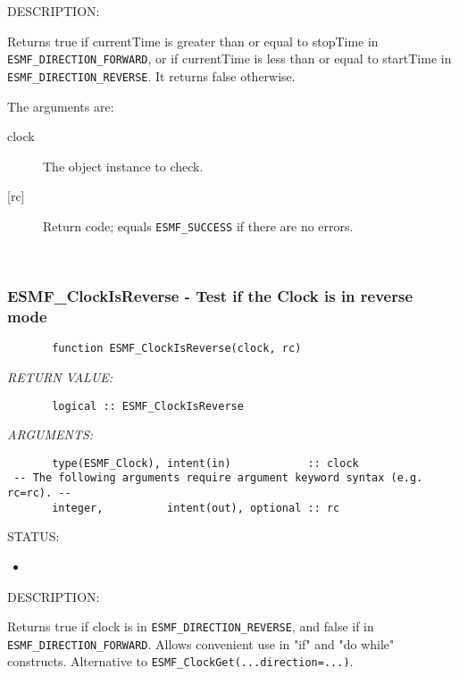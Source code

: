 {\sf DESCRIPTION:\\ }


       Returns true if currentTime is greater than or equal to stopTime
       in {\tt ESMF\_DIRECTION\_FORWARD}, or if currentTime is less than or
       equal to startTime in {\tt ESMF\_DIRECTION\_REVERSE}.  It returns false
       otherwise.
  
       The arguments are:
       \begin{description}
       \item[clock]
            The object instance to check.
       \item[{[rc]}]
            Return code; equals {\tt ESMF\_SUCCESS} if there are no errors.
       \end{description} 
 
\mbox{}\hrulefill\ 
 
\subsubsection [ESMF\_ClockIsReverse] {ESMF\_ClockIsReverse - Test if the Clock is in reverse mode}


 
\begin{verbatim}       function ESMF_ClockIsReverse(clock, rc)\end{verbatim}{\em RETURN VALUE:}
\begin{verbatim}       logical :: ESMF_ClockIsReverse
 \end{verbatim}{\em ARGUMENTS:}
\begin{verbatim}       type(ESMF_Clock), intent(in)            :: clock
 -- The following arguments require argument keyword syntax (e.g. rc=rc). --
       integer,          intent(out), optional :: rc
 \end{verbatim}
{\sf STATUS:}
   \begin{itemize}
   \item{}
   \end{itemize}
  
{\sf DESCRIPTION:\\ }


       Returns true if clock is in {\tt ESMF\_DIRECTION\_REVERSE}, and false if
       in {\tt ESMF\_DIRECTION\_FORWARD}.  Allows convenient use in "if" and
       "do while" constructs.  Alternative to
       {\tt ESMF\_ClockGet(...direction=...)}.
  
